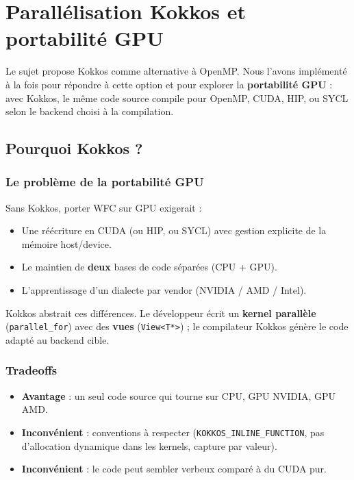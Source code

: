 \chapter{Parallélisation Kokkos et portabilité GPU}
\label{chap:kokkos}

Le sujet propose Kokkos comme alternative à OpenMP. Nous l'avons implémenté à la fois pour répondre à cette option et pour explorer la \textbf{portabilité GPU} : avec Kokkos, le même code source compile pour OpenMP, CUDA, HIP, ou SYCL selon le backend choisi à la compilation.

\section{Pourquoi Kokkos ?}

\subsection{Le problème de la portabilité GPU}

Sans Kokkos, porter WFC sur GPU exigerait :
\begin{itemize}
    \item Une réécriture en CUDA (ou HIP, ou SYCL) avec gestion explicite de la mémoire host/device.
    \item Le maintien de \textbf{deux} bases de code séparées (CPU + GPU).
    \item L'apprentissage d'un dialecte par vendor (NVIDIA / AMD / Intel).
\end{itemize}

Kokkos abstrait ces différences. Le développeur écrit un \textbf{kernel parallèle} (\texttt{parallel\_for}) avec des \textbf{vues} (\texttt{View<T*>}) ; le compilateur Kokkos génère le code adapté au backend cible.

\subsection{Tradeoffs}

\begin{itemize}
    \item \textbf{Avantage} : un seul code source qui tourne sur CPU, GPU NVIDIA, GPU AMD.
    \item \textbf{Inconvénient} : conventions à respecter (\texttt{KOKKOS\_INLINE\_FUNCTION}, pas d'allocation dynamique dans les kernels, capture par valeur).
    \item \textbf{Inconvénient} : le code peut sembler verbeux comparé à du CUDA pur.
\end{itemize}

